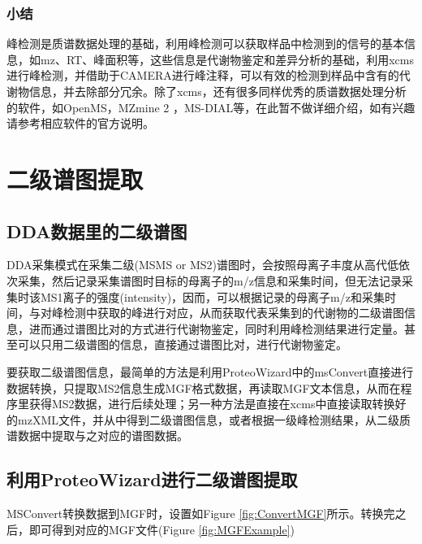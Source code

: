 \documentclass[]{ctexbook}
\begin{document}
\subsection{小结}

峰检测是质谱数据处理的基础，利用峰检测可以获取样品中检测到的信号的基本信息，如mz、RT、峰面积等，这些信息是代谢物鉴定和差异分析的基础，利用xcms进行峰检测，并借助于CAMERA进行峰注释，可以有效的检测到样品中含有的代谢物信息，并去除部分冗余。除了xcms，还有很多同样优秀的质谱数据处理分析的软件，如OpenMS，MZmine 2 ，MS-DIAL等，在此暂不做详细介绍，如有兴趣请参考相应软件的官方说明。

\hypertarget{chapMSMS}{%
\chapter{二级谱图提取}\label{chapMSMS}}

\hypertarget{dda}{%
\section{DDA数据里的二级谱图}\label{dda}}

DDA采集模式在采集二级(MSMS or MS2)谱图时，会按照母离子丰度从高代低依次采集，然后记录采集谱图时目标的母离子的m/z信息和采集时间，但无法记录采集时该MS1离子的强度(intensity)，因而，可以根据记录的母离子m/z和采集时间，与对峰检测中获取的峰进行对应，从而获取代表采集到的代谢物的二级谱图信息，进而通过谱图比对的方式进行代谢物鉴定，同时利用峰检测结果进行定量。甚至可以只用二级谱图的信息，直接通过谱图比对，进行代谢物鉴定。

要获取二级谱图信息，最简单的方法是利用ProteoWizard中的msConvert直接进行数据转换，只提取MS2信息生成MGF格式数据，再读取MGF文本信息，从而在程序里获得MS2数据，进行后续处理；另一种方法是直接在xcms中直接读取转换好的mzXML文件，并从中得到二级谱图信息，或者根据一级峰检测结果，从二级质谱数据中提取与之对应的谱图数据。

\hypertarget{proteowizard}{%
\section{利用ProteoWizard进行二级谱图提取}\label{proteowizard}}

MSConvert转换数据到MGF时，设置如Figure \ref{fig:ConvertMGF}所示。转换完之后，即可得到对应的MGF文件(Figure \ref{fig:MGFExample})
\end{document}
